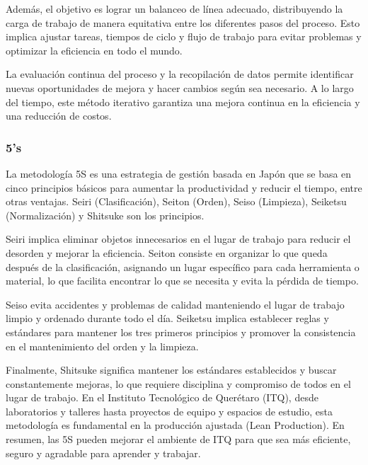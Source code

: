 Además, el objetivo es lograr un balanceo de línea adecuado, distribuyendo la carga de trabajo de manera equitativa entre los diferentes pasos del proceso. Esto implica ajustar tareas, tiempos de ciclo y flujo de trabajo para evitar problemas y optimizar la eficiencia en todo el mundo.

La evaluación continua del proceso y la recopilación de datos permite identificar nuevas oportunidades de mejora y hacer cambios según sea necesario. A lo largo del tiempo, este método iterativo garantiza una mejora continua en la eficiencia y una reducción de costos.
% 
% 
\subsubsection{5's}

La metodología 5S es una estrategia de gestión basada en Japón que se basa en cinco principios básicos para aumentar la productividad y reducir el tiempo, entre otras ventajas. Seiri (Clasificación), Seiton (Orden), Seiso (Limpieza), Seiketsu (Normalización) y Shitsuke son los principios.

Seiri implica eliminar objetos innecesarios en el lugar de trabajo para reducir el desorden y mejorar la eficiencia. Seiton consiste en organizar lo que queda después de la clasificación, asignando un lugar específico para cada herramienta o material, lo que facilita encontrar lo que se necesita y evita la pérdida de tiempo.

Seiso evita accidentes y problemas de calidad manteniendo el lugar de trabajo limpio y ordenado durante todo el día. Seiketsu implica establecer reglas y estándares para mantener los tres primeros principios y promover la consistencia en el mantenimiento del orden y la limpieza.

Finalmente, Shitsuke significa mantener los estándares establecidos y buscar constantemente mejoras, lo que requiere disciplina y compromiso de todos en el lugar de trabajo. En el Instituto Tecnológico de Querétaro (ITQ), desde laboratorios y talleres hasta proyectos de equipo y espacios de estudio, esta metodología es fundamental en la producción ajustada (Lean Production). En resumen, las 5S pueden mejorar el ambiente de ITQ para que sea más eficiente, seguro y agradable para aprender y trabajar.
% 
% 
